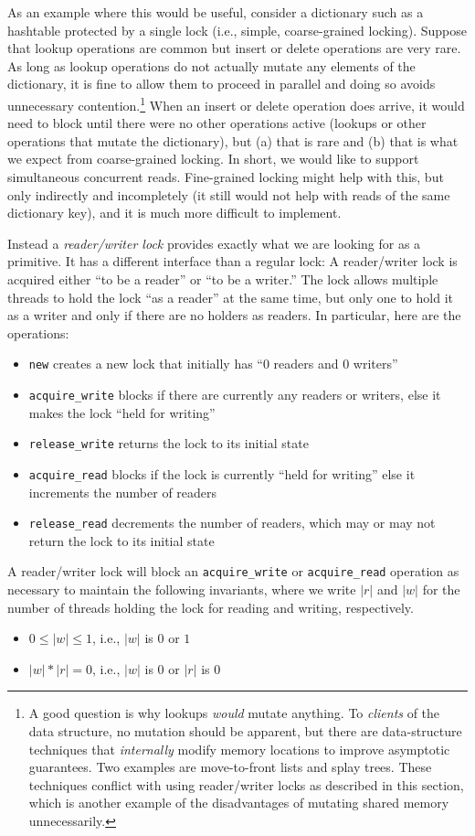 \documentclass[10pt]{article}
\begin{document}
As an example where this would be useful, consider a dictionary such
as a hashtable protected by a single lock (i.e., simple,
coarse-grained locking).  Suppose that lookup operations are common
but insert or delete operations are very rare.  As long as lookup
operations do not actually mutate any elements of the dictionary, it
is fine to allow them to proceed in parallel and doing so avoids
unnecessary contention.\footnote{A good question is why lookups
  \emph{would} mutate anything.  To \emph{clients} of the data
  structure, no mutation should be apparent, but there are
  data-structure techniques that \emph{internally} modify memory
  locations to improve asymptotic guarantees.  Two examples are
  move-to-front lists and splay trees.  These techniques conflict with
  using reader/writer locks as described in this section, which is
  another example of the disadvantages of mutating shared memory
  unnecessarily.}  When an insert or delete operation does arrive, it
would need to block until there were no other operations active
(lookups or other operations that mutate the dictionary), but (a) that
is rare and (b) that is what we expect from coarse-grained locking.
In short, we would like to support simultaneous concurrent reads.
Fine-grained locking might help with this, but only indirectly and
incompletely (it still would not help with reads of the same
dictionary key), and it is much more difficult to implement.

Instead a \emph{reader/writer lock} provides exactly what we are
looking for as a primitive.  It has a different interface than a
regular lock: A reader/writer lock is acquired either ``to be a
reader'' or ``to be a writer.''  The lock allows multiple threads to
hold the lock ``as a reader'' at the same time, but only one to hold
it as a writer and only if there are no holders as readers.  In
particular, here are the operations:
\begin{itemize}
\item {\tt new} creates a new lock that initially has ``0 readers and
  0 writers''
\item {\tt acquire\_write} blocks if there are currently any readers
  or writers, else it makes the lock ``held for writing''
\item {\tt release\_write} returns the lock to its initial state
\item {\tt acquire\_read} blocks if the lock is currently ``held for
  writing'' else it increments the number of readers
\item {\tt release\_read} decrements the number of readers, which may or
  may not return the lock to its initial state
\end{itemize}
A reader/writer lock will block an {\tt acquire\_write} or {\tt acquire\_read} operation as necessary to
maintain the following invariants, where we write $|r|$ and $|w|$ for
the number of threads holding the lock for reading and writing, respectively.
\begin{itemize}
\item $0\leq|w|\leq 1$, i.e., $|w|$ is $0$ or $1$
\item $|w|*|r|=0$, i.e., $|w|$ is $0$ or $|r|$ is $0$
\end{itemize}
\end{document}
